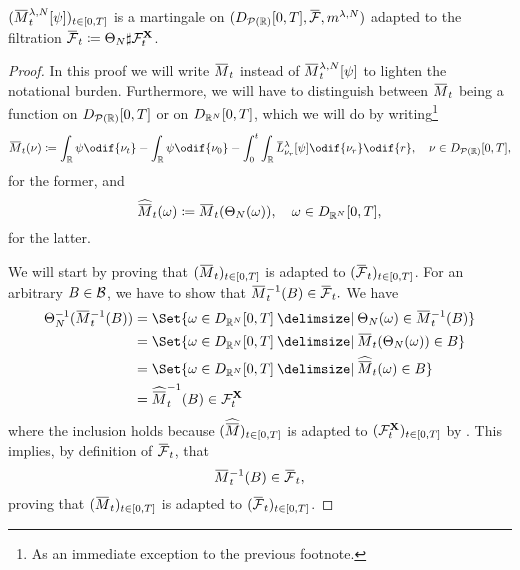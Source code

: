 \begin{proposition}\label{prop:emp-M-mart}
  \((\ol{M}_t^{\lambda, N}[\psi])_{t\in[0,T]}\) is a martingale on \((D_{\cP(\potspace)}[0,T], \ol{\cF}, \lawmu^{\lambda,N})\) adapted to the filtration \mbox{\( \ol{\cF}_t \coloneqq \Theta_N \sharp \cF_t^{\bm{X}} \)}.
\end{proposition}
\begin{proof}
  In this proof we will write \( \ol{M}_t \) instead of \( \ol{M}_t^{\lambda, N}[\psi] \) to lighten the notational burden.
  Furthermore, we will have to distinguish between \( \ol{M}_t \) being a function on \( D_{\mathcal{P}(\mathbb{R})}[0,T] \) or on \( D_{\mathbb{R}^N}[0,T] \), which we will do by writing\footnote{As an immediate exception to the previous footnote.}
  \begin{equation}
    \ol{M}_t(\nu) \coloneqq \int_\potspace \psi \odif{\nu_t} - \int_\potspace \psi \odif{\nu_0}
    - \int_0^t \int_\potspace \ol{L}_{\nu_r}^{\lambda} [\psi] \odif{\nu_r} \odif{r},
    \quad \nu \in D_{\cP(\potspace)}[0,T],
  \end{equation}
  for the former, and
  \begin{equation}
    \widehat{\ol{M}}_t(\bm{\omega}) \coloneqq \ol{M}_t(\Theta_N(\bm{\omega})), \quad \bm{\omega} \in D_{\potspace^N}[0,T],
  \end{equation}
  for the latter.

  We will start by proving that \( (\ol{M}_t)_{t\in[0,T]} \) is adapted to \( (\ol{\cF}_t)_{t\in[0,T]} \).
  For an arbitrary \( B \in \mathcal{B} \), we have to show that
  \mbox{\begin{math}
      \ol{M}_t^{-1} (B) \in \ol{\cF}_t.
    \end{math}}
  We have
  \begin{equation}
    \begin{split}
      \Theta_N^{-1}(\ol{M}_t^{-1} (B))
       & = \Set{ \bm{\omega} \in D_{\potspace^N}[0,T] \given \Theta_N(\bm{\omega}) \in \ol{M}_t^{-1} (B) } \\
       & = \Set{ \bm{\omega} \in D_{\potspace^N}[0,T] \given \ol{M}_t(\Theta_N(\bm{\omega})) \in B }       \\
       & = \Set{ \bm{\omega} \in D_{\potspace^N}[0,T] \given \widehat{\ol{M}}_t(\bm{\omega}) \in B }       \\
       & = \widehat{\ol{M}}_t^{-1}(B) \in \cF_t^{\bm{X}}
    \end{split}
  \end{equation}
  where the inclusion holds because \( (\widehat{\ol{M}})_{t\in[0,T]} \) is adapted to \( (\mathcal{F}_t^{\mathbf{X}})_{t\in[0,T]} \) by .
  This implies, by definition of \( \ol{\cF}_t \), that
  \begin{equation}
    \ol{M}_t^{-1} (B) \in \ol{\cF}_t,
  \end{equation}
  proving that \( (\ol{M}_t)_{t\in[0,T]} \) is adapted to \( (\ol{\cF}_t)_{t\in[0,T]} \).


\end{proof}

